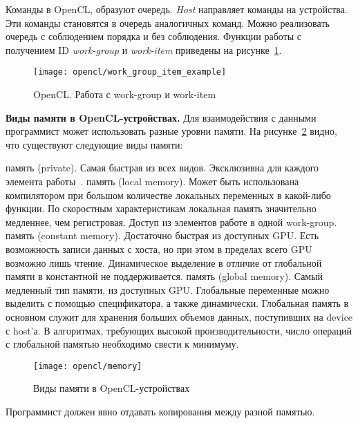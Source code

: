 Команды в OpenCL, образуют очередь. \textit{Host} направляет команды на устройства. Эти команды становятся в очередь аналогичных команд. Можно реализовать очередь с соблюдением порядка и без соблюдения.
Функции работы с получением ID \textit{work-group} и \textit{work-item} приведены на рисунке~\ref{OpenCLWorkGroupItemExample:image}.

\begin{figure}[H]
    \texttt{[image: opencl/work\_group\_item\_example]}
    \caption{OpenCL. Работа с work-group и work-item}
    \label{OpenCLWorkGroupItemExample:image}
\end{figure}

\textbf{Виды памяти в OpenCL-устройствах.} Для взаимодействия с данными программист может использовать разные уровни памяти. На рисунке~\ref{OpenCLMemory:image} видно, что существуют следующие виды памяти:

\begin{itemize}
     память (private). Самая быстрая из всех видов. Эксклюзивна для каждого элемента работы~\cite{Bastrakov2011}.
     память (local memory). Может быть использована компилятором при большом количестве локальных переменных в какой-либо функции. По скоростным характеристикам локальная память значительно медленнее, чем регистровая. Доступ из элементов работе в одной work-group.
     память (constant memory). Достаточно быстрая из доступных GPU. Есть возможность записи данных с хоста, но при этом в пределах всего GPU возможно лишь чтение. Динамическое выделение в отличие от глобальной памяти в константной не поддерживается.
     память (global memory). Самый медленный тип памяти, из доступных GPU. Глобальные переменные можно выделить с помощью спецификатора, а также динамически. Глобальная память в основном служит для хранения больших объемов данных, поступивших на device с host’а. В алгоритмах, требующих высокой производительности, число операций с глобальной памятью необходимо свести к минимуму.
\end{itemize}	

\begin{figure}[H]
    \texttt{[image: opencl/memory]}
    \caption{Виды памяти в OpenCL-устройствах}
    \label{OpenCLMemory:image}
\end{figure}

Программист должен явно отдавать копирования между разной памятью.

